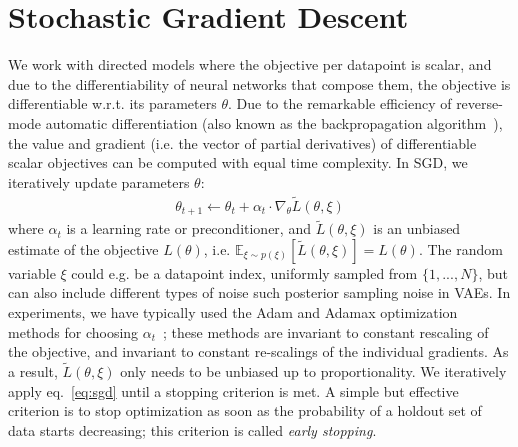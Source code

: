 \documentclass[MAL,biber]{nowfnt} %
\newcommand{\Exp}[2]{\mathbb{E}_{#1}\left[#2\right]}
\begin{document}
\section{Stochastic Gradient Descent}\label{sec:sgd}

We work with directed models where the objective per datapoint is scalar, and due to the differentiability of neural networks that compose them, the objective is differentiable w.r.t. its parameters $\theta$. 
Due to the remarkable efficiency of reverse-mode automatic differentiation (also known as the backpropagation algorithm~\citep{rumelhart1988learning}), the value and gradient (i.e. the vector of partial derivatives) of differentiable scalar objectives can be computed with equal time complexity. 
In SGD, we iteratively update parameters $\theta$:
\begin{align}
\theta_{t+1} \leftarrow \theta_t + \alpha_t \cdot \nabla_\theta \tilde{L}(\theta, \xi)
\label{eq:sgd}
\end{align}
where $\alpha_t$ is a learning rate or preconditioner, and $\tilde{L}(\theta,\xi)$ is an unbiased estimate of the objective $L(\theta)$, i.e. $\Exp{\xi \sim p(\xi)}{\tilde{L}(\theta, \xi)} = L(\theta)$. The random variable $\xi$ could e.g. be a datapoint index, uniformly sampled from $\{1,...,N\}$, but can also include different types of noise such posterior sampling noise in VAEs. In experiments, we have typically used the Adam and Adamax optimization methods for choosing $\alpha_t$~\citep{kingma2015adam}; these methods are invariant to constant rescaling of the objective, and invariant to constant re-scalings of the individual gradients. As a result, $\tilde{L}(\theta, \xi)$ only needs to be unbiased up to proportionality. We iteratively apply eq.~\eqref{eq:sgd} until a stopping criterion is met. A simple but effective criterion is to stop optimization as soon as the probability of a holdout set of data starts decreasing; this criterion is called \emph{early stopping}.

\backmatter

\printbibliography
\end{document}
